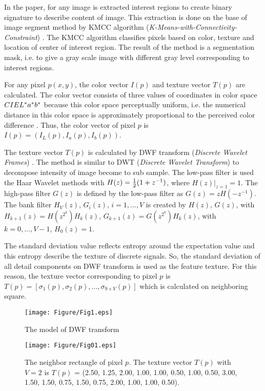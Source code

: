 \documentclass{amcs}
\begin{document}
In the paper, for any image is extracted interest regions to create binary signature to describe content of image. This extraction is done on the base of image segment method by KMCC algorithm (\textit{K-Means-with-Connectivity-Constraint}) \cite{Kom:00}. The KMCC algorithm classifies pixels based on color, texture and location of center of interest region. The result of the method is a segmentation mask, i.e. to give a gray scale image with different gray level corresponding to interest regions.

For any pixel $p(x,y)$, the color vector $I(p)$ and texture vector $T(p)$ are calculated. The color vector consists of three values of coordinates in color space $CIE{\rm{ }}{L^*}{a^*}{b^*}$ because this color space perceptually uniform, i.e. the numerical distance in this color space is approximately proportional to the perceived color difference  \cite{Mezaris:04}. Thus, the color vector of pixel $p$ is $I(p) = ({I_L}(p),{I_a}(p),{I_b}(p))$.

The texture vector $T(p)$ is calculated by DWF transform (\textit{Discrete Wavelet Frames})  \cite{Mezaris:04}. The method is similar to DWT (\textit{Discrete Wavelet Transform}) to decompose intensity of image become to sub sample. The low-pass filter is used the Haar Wavelet methods with $H(z) = {\textstyle{1 \over 2}}(1 + {z^{ - 1}})$, where $H(z){|_{z = 1}} = 1$. The high-pass filter $G(z)$ is defined by the low-pass filter as $G(z) = zH( - {z^{ - 1}})$. The bank filter ${H_V}(z)$, ${G_i}(z)$, $i = 1,...,V$ is created by $H(z)$, $G(z)$, with ${H_{k + 1}}(z) = H({z^{{2^k}}}){H_k}(z)$, ${G_{k + 1}}(z) = G({z^{{2^k}}}){H_k}(z)$, with $k = 0,...,V - 1$, ${H_0}(z) = 1$.

The standard deviation value reflects entropy around the expectation value and this entropy describe the texture of discrete signals. So, the standard deviation of all detail components on DWF transform is used as the feature texture.  For this reason, the texture vector corresponding to pixel $p$ is $T(p) = [{\sigma _1}(p),{\sigma _2}(p),...,{\sigma _{9 \times V}}(p)]$ which is calculated on neighboring square.

\begin{figure}[!ht]
	\centering
		\texttt{[image: Figure/Fig1.eps]}
		\caption{The model of DWF transform}
\end{figure}
\begin{figure}[ht]
	\centering
		\texttt{[image: Figure/Fig01.eps]}
		\caption{The neighbor rectangle of pixel $p$. The texture vector $T(p)$ with $V = 2$ is $T(p)$ = (2.50, 1.25, 2.00, 1.00, 1.00, 0.50, 1.00, 0.50, 3.00, 1.50, 1.50, 0.75, 1.50, 0.75, 2.00, 1.00, 1.00, 0.50).}
\end{figure}
\end{document}
